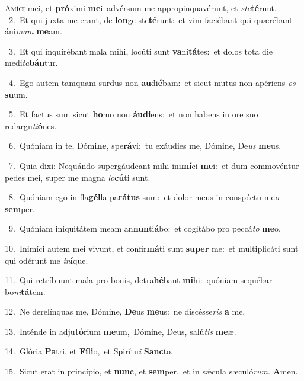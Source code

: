 \lettrine{\initial\textcolor{\initialcolor}{A}}{míci} mei, et \textbf{pró}\-ximi \textbf{me}\-i~\star advérsum me appropinquavérunt, et \textit{ste}\-\textbf{té}runt.\\
{\numbfont\textcolor{\numbcolor}{~2.}}~Et qui juxta me erant, de \textbf{lon}\-ge ste\-\textbf{té}\-runt:~\star et vim faciébant qui quærébant áni\textit{mam} \textbf{me}\-am.\par
{\numbfont\textcolor{\numbcolor}{~3.}}~Et qui inquirébant mala mihi, locúti sunt \textbf{va}\-ni\-\textbf{tá}\-tes:~\star et dolos tota die medi\-\textit{ta}\-\textbf{bán}tur.\par
{\numbfont\textcolor{\numbcolor}{~4.}}~Ego autem tamquam surdus non \textbf{au}\-di\-\textbf{é}\-bam:~\star et sicut mutus non apériens \textit{os} \textbf{su}\-um.\par
{\numbfont\textcolor{\numbcolor}{~5.}}~Et factus sum sicut \textbf{ho}\-mo non \textbf{áu}\-\textbf{di}ens:~\star et non habens in ore suo redargu\-\textit{ti}\-\textbf{ó}nes.\par
{\numbfont\textcolor{\numbcolor}{~6.}}~Quóniam in te, Dómi\-\textbf{ne}\-, spe\-\textbf{rá}\-vi:~\star tu exáudies me, Dómine, De\textit{us} \textbf{me}\-us.\par
{\numbfont\textcolor{\numbcolor}{~7.}}~Quia dixi: Nequándo supergáudeant mihi ini\-\textbf{mí}\-ci \textbf{me}\-i:~\star et dum commovéntur pedes mei, super me magna \textit{lo}\-\textbf{cú}ti sunt.\par
{\numbfont\textcolor{\numbcolor}{~8.}}~Quóniam ego in fla\-\textbf{gél}\-la pa\-\textbf{rá}\-\textbf{tus} sum:~\star et dolor meus in conspéctu me\textit{o} \textbf{sem}\-per.\par
{\numbfont\textcolor{\numbcolor}{~9.}}~Quóniam iniquitátem meam an\-\textbf{nun}\-ti\-\textbf{á}\-bo:~\star et cogitábo pro peccá\textit{to} \textbf{me}\-o.\par
{\numbfont\textcolor{\numbcolor}{10.}}~Inimíci autem mei vivunt, et confir\-\textbf{má}\-ti sunt \textbf{su}\-\textbf{per} me:~\star et multiplicáti sunt qui odérunt me \textit{in}\-\textbf{í}que.\par
{\numbfont\textcolor{\numbcolor}{11.}}~Qui retríbuunt mala pro bonis, detra\-\textbf{hé}\-bant \textbf{mi}\-hi:~\star quóniam sequébar bo\-\textit{ni}\-\textbf{tá}tem.\par
{\numbfont\textcolor{\numbcolor}{12.}}~Ne derelínquas me, Dómine, \textbf{De}\-us \textbf{me}\-us:~\star ne discésse\textit{ris} \textbf{a} me.\par
{\numbfont\textcolor{\numbcolor}{13.}}~Inténde in adju\-\textbf{tó}\-rium \textbf{me}\-um,~\star Dómine, Deus, salú\textit{tis} \textbf{me}\-æ.\par
{\numbfont\textcolor{\numbcolor}{14.}}~Glória \textbf{Pa}\-tri, et \textbf{Fí}\-\textbf{li}o,~\star et Spirítu\textit{i} \textbf{Sanc}\-to.\par
{\numbfont\textcolor{\numbcolor}{15.}}~Sicut erat in princípio, et \textbf{nunc}\-, et \textbf{sem}\-per,~\star et in sǽcula sæculó\-\textit{rum}\-. \textbf{A}\-men.\par
